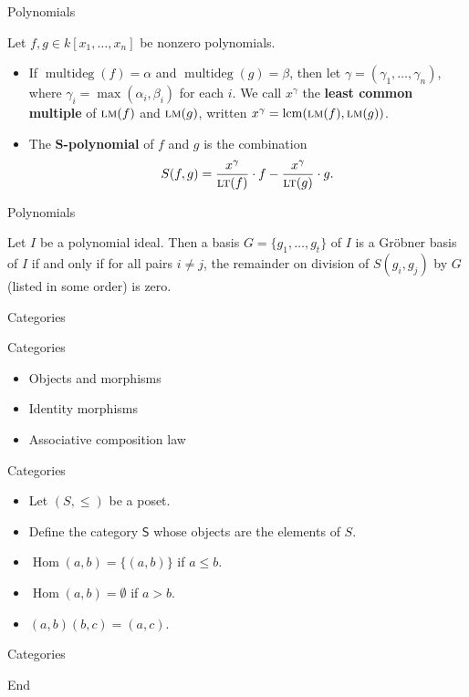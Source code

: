 \documentclass{beamer}
\DeclareMathOperator{\Hom}{Hom}
\DeclareMathOperator{\lcm}{lcm}
\newcommand{\LT}{\ensuremath{\text{\sc lt}}}
\newcommand{\LM}{\ensuremath{\text{\sc lm}}}
\DeclareMathOperator{\multideg}{multideg}
\begin{document}
\begin{frame}{Polynomials}
  \begin{definition}
    Let $f,g \in k[x_1,\dots,x_n]$ be nonzero polynomials.
    \begin{itemize}
      \item<2-> If $\multideg(f) = \alpha$ and $\multideg(g) = \beta$, then let $\gamma  =(\gamma_1,\dots,\gamma_n)$, where $\gamma_i = \max(\alpha_i,\beta_i)$ for each $i$. We call $x^\gamma$ the \textbf{least common multiple} of $\LM(f)$ and $\LM(g)$, written $x^\gamma = \lcm(\LM(f),\LM(g))$.
      \item<3-> The \textbf{$\mathbf S$-polynomial} of $f$ and $g$ is the combination
      \[ S(f,g) = \frac{x^\gamma}{\LT(f)} \cdot f - \frac{x^\gamma}{\LT(g)} \cdot g. \]
    \end{itemize}
  \end{definition}
\end{frame}

\begin{frame}{Polynomials}
  \begin{theorem}
    Let $I$ be a polynomial ideal. Then a basis $G = \{g_1,\dots,g_t\}$ of $I$ is a Gr\"obner basis of $I$ if and only if for all pairs $i \ne j$, the remainder on division of $S(g_i,g_j)$ by $G$ (listed in some order) is zero.
  \end{theorem}
\end{frame}

\begin{frame}{Categories}
\end{frame}

\begin{frame}{Categories}
  \begin{itemize}
    \item Objects and morphisms
    \item<2-> Identity morphisms
    \item<3-> Associative composition law
  \end{itemize}
\end{frame}

\begin{frame}{Categories}
  \begin{itemize}
    \item Let $(S,\le)$ be a poset.
    \item<2-> Define the category $\mathsf S$ whose objects are the elements of $S$.
    \item<3-> $\Hom(a,b) = \{(a,b)\}$ if $a \le b$.
    \item<4-> $\Hom(a,b) = \emptyset$ if $a > b$.
    \item<5-> $(a,b)(b,c)=(a,c)$.
  \end{itemize}
\end{frame}

\begin{frame}{Categories}

\end{frame}

\begin{frame}{End}
\end{frame}
\end{document}
